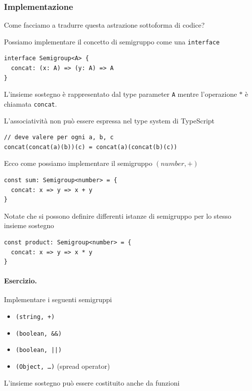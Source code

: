 \documentclass[12pt]{article}
\begin{document}
\subsubsection{Implementazione}

Come facciamo a tradurre questa astrazione sottoforma di codice?

Possiamo implementare il concetto di semigruppo come una \texttt{interface}

\begin{verbatim}
interface Semigroup<A> {
  concat: (x: A) => (y: A) => A
}
\end{verbatim}

L'insieme sostegno è rappresentato dal type parameter \texttt{A} mentre l'operazione $*$ è chiamata \texttt{concat}.

L'associatività non può essere espressa nel type system di TypeScript

\begin{verbatim}
// deve valere per ogni a, b, c
concat(concat(a)(b))(c) = concat(a)(concat(b)(c))
\end{verbatim}

Ecco come possiamo implementare il semigruppo $(number, +)$

\begin{verbatim}
const sum: Semigroup<number> = {
  concat: x => y => x + y
}
\end{verbatim}

Notate che si possono definire differenti istanze di semigruppo per lo stesso insieme sostegno

\begin{verbatim}
const product: Semigroup<number> = {
  concat: x => y => x * y
}
\end{verbatim}

\paragraph{Esercizio.} Implementare i seguenti semigruppi
\begin{itemize}
  \item \texttt{(string, +)}
  \item \texttt{(boolean, \&\&)}
  \item \texttt{(boolean, ||)}
  \item \texttt{(Object, \ldots)} (spread operator)
\end{itemize}

L'insieme sostegno può essere costituito anche da funzioni
\end{document}
